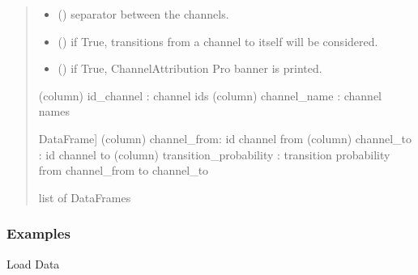 \documentclass[letterpaper,10pt,english]{sphinxmanual}
\begin{document}
\begin{fulllineitems}
\begin{quote}
\begin{description}
\begin{itemize}
\item {} 
\sphinxAtStartPar
{} (\sphinxstyleliteralemphasis{\sphinxupquote{, }}) \textendash{} separator between the channels.

\item {} 
\sphinxAtStartPar
{} (\sphinxstyleliteralemphasis{\sphinxupquote{, }}) \textendash{} if True, transitions from a channel to itself will be considered.

\item {} 
\sphinxAtStartPar
{} (\sphinxstyleliteralemphasis{\sphinxupquote{, }}) \textendash{} if True, ChannelAttribution Pro banner is printed.

\end{itemize}

\sphinxAtStartPar
\begin{description}
\sphinxAtStartPar
(column) id\_channel : channel ids
(column) channel\_name : channel names

\sphinxlineitem{transition\_matrix}{[}DataFrame{]}
\sphinxAtStartPar
(column) channel\_from: id channel from
(column) channel\_to : id channel to
(column) transition\_probability : transition probability from channel\_from to channel\_to

\end{description}


\sphinxAtStartPar
list of DataFrames

\end{description}\end{quote}
\subsubsection*{Examples}

\sphinxAtStartPar
Load Data

\begin{sphinxVerbatim}[commandchars=\\\{\}]
 
  
\end{sphinxVerbatim}


\end{fulllineitems}
\end{document}
